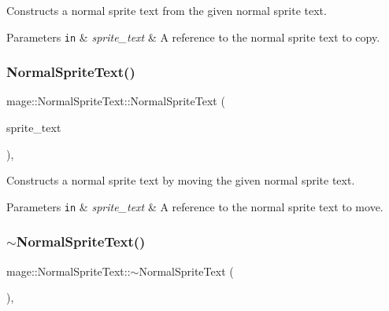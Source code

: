 Constructs a normal sprite text from the given normal sprite text.


\begin{DoxyParams}[1]{Parameters}
\mbox{\tt in}  & {\em sprite\+\_\+text} & A reference to the normal sprite text to copy. \\
\hline
\end{DoxyParams}
\hypertarget{classmage_1_1_normal_sprite_text_a5c5cacdef40bf1c5aaf7351cd0714b17}{}\label{classmage_1_1_normal_sprite_text_a5c5cacdef40bf1c5aaf7351cd0714b17} 
\subsubsection{\texorpdfstring{Normal\+Sprite\+Text()}{NormalSpriteText()}\hspace{0.1cm}{\footnotesize\ttfamily [3/3]}}
{\footnotesize\ttfamily mage\+::\+Normal\+Sprite\+Text\+::\+Normal\+Sprite\+Text (\begin{DoxyParamCaption}\item[{\hyperlink{classmage_1_1_normal_sprite_text}{Normal\+Sprite\+Text} \&\&}]{sprite\+\_\+text }\end{DoxyParamCaption})\hspace{0.3cm}{\ttfamily [default]}, {\ttfamily [noexcept]}}

Constructs a normal sprite text by moving the given normal sprite text.


\begin{DoxyParams}[1]{Parameters}
\mbox{\tt in}  & {\em sprite\+\_\+text} & A reference to the normal sprite text to move. \\
\hline
\end{DoxyParams}
\hypertarget{classmage_1_1_normal_sprite_text_ae8575ab8ece5b8b923509fc7ab4d3dea}{}\label{classmage_1_1_normal_sprite_text_ae8575ab8ece5b8b923509fc7ab4d3dea} 
\subsubsection{\texorpdfstring{$\sim$\+Normal\+Sprite\+Text()}{~NormalSpriteText()}}
{\footnotesize\ttfamily mage\+::\+Normal\+Sprite\+Text\+::$\sim$\+Normal\+Sprite\+Text (\begin{DoxyParamCaption}{ }\end{DoxyParamCaption})\hspace{0.3cm}{\ttfamily [virtual]}, {\ttfamily [default]}}

